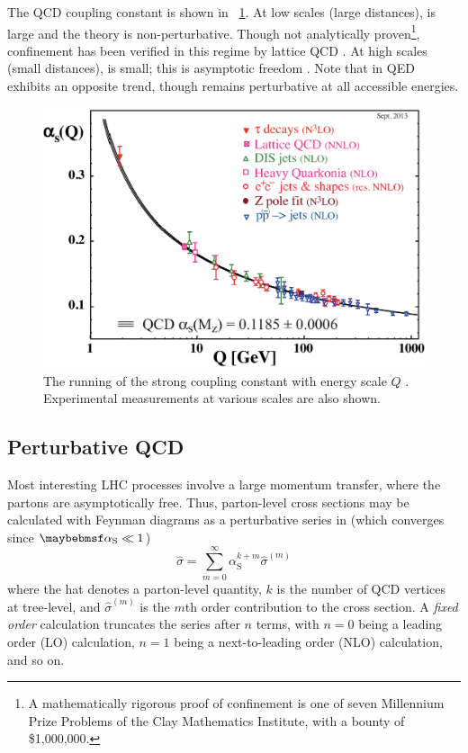 The QCD coupling constant \alphaS is shown in \Figure~\ref{fig:qcd:alpha_s}. At low 
scales (large distances), \alphaS is large and the theory is non-perturbative. 
Though not analytically proven\footnote{
	A mathematically rigorous proof of confinement is one of seven Millennium Prize 
	Problems of the Clay Mathematics Institute, with a bounty of \$1,000,000.
}, confinement has been verified in this regime by lattice QCD \cite{Wilson:1974}. 
At high scales (small distances), \alphaS is small; this is asymptotic freedom 
\cite{Gross:1973,Politzer:1973}. Note that \alphaEM in QED exhibits an opposite 
trend, though remains perturbative at all accessible energies.
\begin{figure}
	\includegraphics[width=\mediumfigwidth]{tex/tools/alpha_s}
	\caption{The running of the strong coupling constant \alphaS with energy scale $Q$ 
	\cite{PDG:2012}. Experimental measurements at various scales are also shown.}
	\label{fig:qcd:alpha_s}
\end{figure}



\subsection{Perturbative QCD}
\label{sec:qcd:pqcd}

Most interesting LHC processes involve a large momentum transfer, where the partons 
are asymptotically free. Thus, parton-level cross sections may be calculated with Feynman 
diagrams as a perturbative series in \alphaS (which converges since $\alphaS \ll 1$)
\begin{equation}
	\hat{\sigma} = \sum\limits_{m=0}^{\infty} \alpha_{\text{S}}^{k+m} \hat{\sigma}^{(m)}
	\label{eq:qcd:partonic_xs}
\end{equation}
where the hat denotes a parton-level quantity, $k$ is the number of QCD vertices at 
tree-level, and $\hat{\sigma}^{(m)}$ is the $m$th order contribution to the cross section.
A \textit{fixed order} calculation truncates the series after $n$ terms, with $n=0$ being 
a leading order (LO) calculation, $n=1$ being a next-to-leading order (NLO) calculation, 
and so on.


